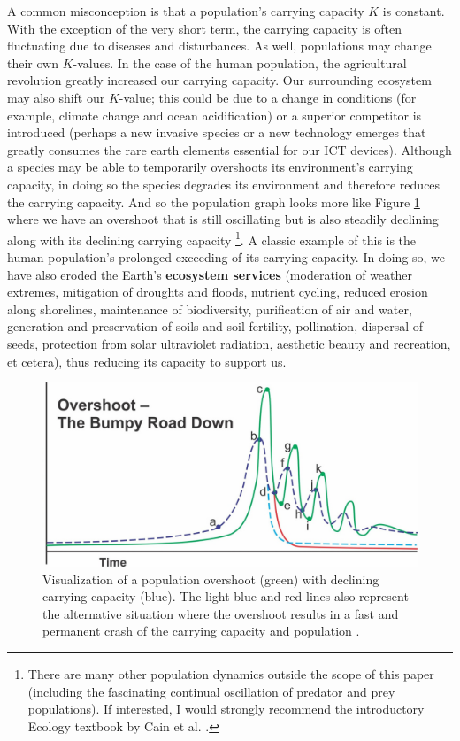 \documentclass{article}
\begin{document}
A common misconception is that a population's carrying capacity $K$ is constant. With the exception of the very short term, the carrying capacity is often fluctuating due to diseases and disturbances. As well, populations may change their own $K$-values. In the case of the human population, the agricultural revolution greatly increased our carrying capacity. Our surrounding ecosystem may also shift our $K$-value; this could be due to a change in conditions (for example, climate change and ocean acidification) or a superior competitor is introduced (perhaps a new invasive species or a new technology emerges that greatly consumes the rare earth elements essential for our ICT devices). Although a species may be able to temporarily overshoots its environment's carrying capacity, in doing so the species degrades its environment and therefore reduces the carrying capacity. And so the population graph looks more like Figure \ref{population_carrying_capacity_declining} where we have an overshoot that is still oscillating but is also steadily declining along with its declining carrying capacity \footnote{There are many other population dynamics outside the scope of this paper (including the fascinating continual oscillation of predator and prey populations). If interested, I would strongly recommend the introductory Ecology textbook by Cain et al. \cite{cain2011ecology}.}. A classic example of this is the human population's prolonged exceeding of its carrying capacity. In doing so, we have also eroded the Earth's \textbf{ecosystem services} (moderation of weather extremes, mitigation of droughts and floods, nutrient cycling, reduced erosion along shorelines, maintenance of biodiversity, purification of air and water, generation and preservation of soils and soil fertility, pollination, dispersal of seeds, protection from solar ultraviolet radiation, aesthetic beauty and recreation, et cetera), thus reducing its capacity to support us.

\begin{figure}[h]
    \includegraphics[width=.8 \textwidth]{./images_moores/population_carrying_capacity_declining.jpeg}
    \centering
    \caption{Visualization of a population overshoot (green) with declining carrying capacity (blue). The light blue and red lines also represent the alternative situation where the overshoot results in a fast and permanent crash of the carrying capacity and population \cite{mills2018bumpyroaddown}.}
    \label{population_carrying_capacity_declining}
\end{figure}
\end{document}
